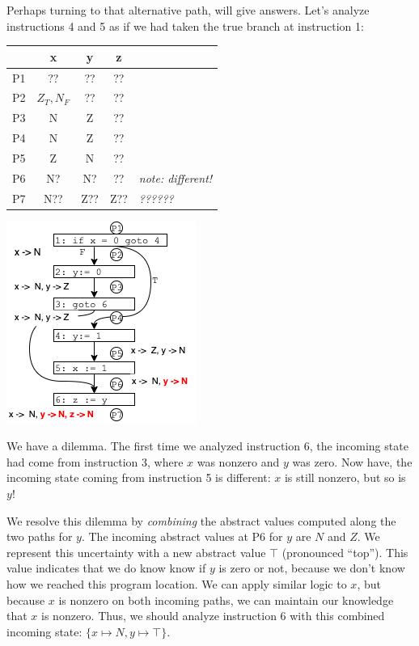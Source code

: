 \documentclass[11pt]{article}
\begin{document}
Perhaps turning to that alternative path, will give answers.  
Let's analyze instructions 4 and 5 as if we had taken the
true branch at instruction 1:

\tablespace
\begin{center}
\begin{minipage}[t][-9.7em][b]{0.5\textwidth} %
\begin{tabular}{r | c c c l}
  & x & y & z \\
\hline
P1 & ?? & ??   & ??  \\
P2 & $Z_T,N_F$ & ??  & ??  \\
P3 & N & Z & ??  \\
P4 & N & Z & ??  \\
P5 & Z & N & ??  \\
P6 & N? & N? & ?? &  \textit{note: different!} \\
P7 & N?? & Z?? & Z?? & \textit{??????} \\
\end{tabular}
\end{minipage}
\hspace*{1em}%
\includegraphics[scale=0.8]{images/alternativepathwrong}
\end{center}
\tablespace

We have a dilemma.  The first time we analyzed instruction 6, the incoming state
had come from instruction 3, where $x$ was nonzero and $y$ was zero.  Now have,
the incoming state coming from instruction 5 is different:  $x$ is still nonzero,
but so is $y$!

We resolve this dilemma by \emph{combining} the abstract values computed along the two
paths for $y$. The incoming abstract values at P6 for $y$ are $N$
and $Z$.    We represent this uncertainty
with a new abstract
value $\top$ (pronounced ``top'').  This value indicates that we do know know if $y$ is zero or not,
because we don't know how we reached this program location. 
We can apply similar logic to $x$, but because $x$ is
nonzero on both incoming paths, we can maintain our knowledge that $x$ is
nonzero.  Thus, we should analyze instruction 6 with this combined
incoming state:  $\{x \mapsto N, y \mapsto {\top}\}$.  
\end{document}
